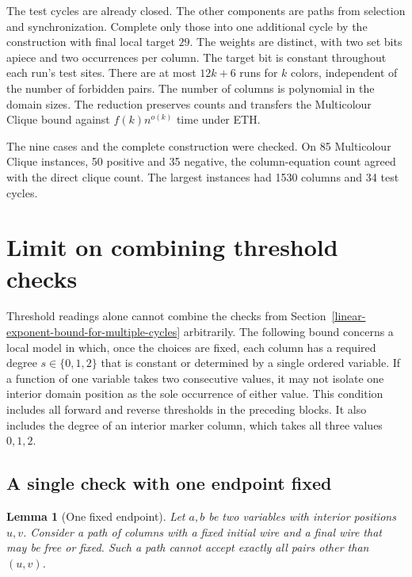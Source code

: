 \documentclass[11pt,a4paper]{article}
\numberwithin{equation}{section}
\newtheorem{lemma}{Lemma}[section]
\begin{document}
The test cycles are already closed. The other components are paths from selection and synchronization. Complete only those into one additional cycle by the construction with final local target \(29\). The weights are distinct, with two set bits apiece and two occurrences per column. The target bit is constant throughout each run's test sites. There are at most \(12k+6\) runs for \(k\) colors, independent of the number of forbidden pairs. The number of columns is polynomial in the domain sizes. The reduction preserves counts and transfers the Multicolour Clique bound against \(f(k)n^{o(k)}\) time under ETH.

The nine cases and the complete construction were checked. On 85 Multicolour Clique instances, 50 positive and 35 negative, the column-equation count agreed with the direct clique count. The largest instances had 1530 columns and 34 test cycles.

\section{Limit on combining threshold checks}\label{limit-on-combining-threshold-checks}

Threshold readings alone cannot combine the checks from Section~\ref{linear-exponent-bound-for-multiple-cycles} arbitrarily. The following bound concerns a local model in which, once the choices are fixed, each column has a required degree \(s\in\{0,1,2\}\) that is constant or determined by a single ordered variable. If a function of one variable takes two consecutive values, it may not isolate one interior domain position as the sole occurrence of either value. This condition includes all forward and reverse thresholds in the preceding blocks. It also includes the degree of an interior marker column, which takes all three values \(0,1,2\).

\subsection{A single check with one endpoint fixed}\label{a-single-check-with-one-endpoint-fixed}

\begin{lemma}[One fixed endpoint]\label{lem:threshold-path}
Let \(a,b\) be two variables with interior positions \(u,v\). Consider a path of columns with a fixed initial wire and a final wire that may be free or fixed. Such a path cannot accept exactly all pairs other than \((u,v)\).
\end{lemma}
\end{document}
